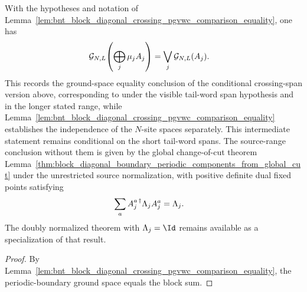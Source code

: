 \begin{lemma}
    \label{lem:bnt_block_diagonal_crossing_pgvwc_comparison_ground_space}
    \leanok
    With the hypotheses and notation of
    Lemma~\ref{lem:bnt_block_diagonal_crossing_pgvwc_comparison_equality}, one has
    \begin{align}
        \mathcal G_{N,L}\!\left(\bigoplus_j\mu_jA_j\right)
         & =
        \bigvee_j\mathcal G_{N,L}(A_j).
        \notag
    \end{align}
    This records the ground-space equality conclusion of the conditional
    crossing-span version above, corresponding to
    \cite[Theorem~12]{PerezGarcia2007Matrix} under the visible
    tail-word span hypothesis and in the longer stated range, while
    Lemma~\ref{lem:bnt_block_diagonal_crossing_pgvwc_comparison_equality}
    establishes the independence of the $N$-site spaces separately.
    This intermediate statement remains conditional on the short tail-word
    spans. The source-range conclusion without them is given by the global
    change-of-cut theorem
    Lemma~\ref{thm:block_diagonal_boundary_periodic_components_from_global_cut}
    under the unrestricted source normalization, with positive definite dual
    fixed points satisfying
    \begin{align}
        \sum_a A_j^{a\,\dagger}\Lambda_j A_j^a & =\Lambda_j. \notag
    \end{align}
    The doubly normalized theorem with $\Lambda_j=\Id$ remains available as a
    specialization of that result.
\end{lemma}

\begin{proof}
    \leanok
    By Lemma~\ref{lem:bnt_block_diagonal_crossing_pgvwc_comparison_equality},
    the periodic-boundary ground space equals the block sum.
\end{proof}

